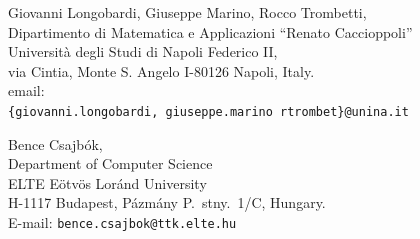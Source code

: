 \documentclass[12pt]{article}
\begin{document}
	
	\vspace{1cm}
	
	\noindent Giovanni Longobardi, Giuseppe Marino, Rocco Trombetti,\\
	Dipartimento di Matematica e Applicazioni “Renato Caccioppoli”\\
	Università degli Studi di Napoli Federico II,\\
	via Cintia, Monte S. Angelo I-80126 Napoli, Italy. \\
	email: \\
	\texttt{\{giovanni.longobardi, giuseppe.marino rtrombet\}@unina.it}
	
	\vspace{1.5cm}
	
	\noindent Bence Csajb\'{o}k,\\
	Department of Computer Science\\
	ELTE E\"otv\"os Lor\'and University\\
	H-1117 Budapest, P\'azm\'any P.\ stny.\ 1/C, Hungary.\\ E-mail: {\texttt{bence.csajbok@ttk.elte.hu}}
	
	
	
	
\end{document}
